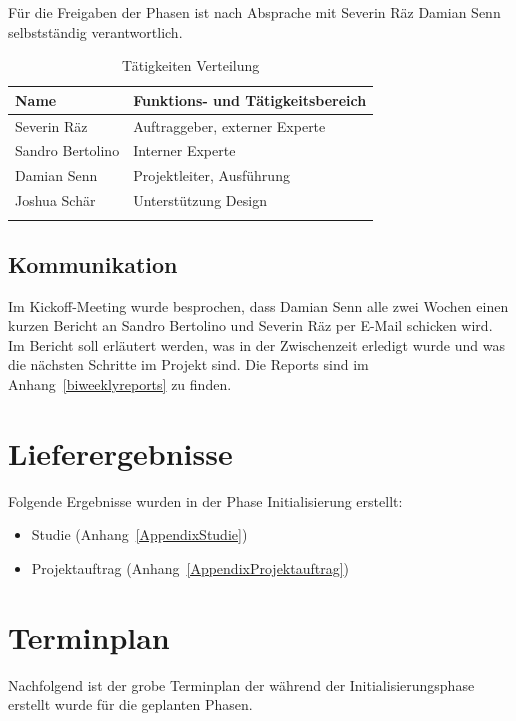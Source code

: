 Für die Freigaben der Phasen ist nach Absprache mit Severin Räz Damian Senn
selbstständig verantwortlich.

\begin{longtable}[]{@{}ll@{}}
  \toprule
  \textbf{Name}    & \textbf{Funktions- und Tätigkeitsbereich}\tabularnewline
  \midrule
  \endhead
  Severin Räz      & Auftraggeber, externer Experte\tabularnewline
  Sandro Bertolino & Interner Experte\tabularnewline
  Damian Senn      & Projektleiter, Ausführung\tabularnewline
  Joshua Schär     & Unterstützung Design\tabularnewline
  \bottomrule
  \caption{Tätigkeiten Verteilung}
\end{longtable}

\subsection{Kommunikation}\label{kommunikation}

Im Kickoff-Meeting wurde besprochen, dass Damian Senn alle zwei Wochen einen
kurzen Bericht an Sandro Bertolino und Severin Räz per E-Mail schicken wird.
Im Bericht soll erläutert werden, was in der Zwischenzeit erledigt wurde und
was die nächsten Schritte im Projekt sind. Die Reports sind im
Anhang~\ref{biweeklyreports} zu finden.



\section{Lieferergebnisse}

Folgende Ergebnisse wurden in der Phase Initialisierung erstellt:

\begin{itemize}
  \tightlist{}
  \item{}Studie (Anhang~\ref{AppendixStudie})
  \item{}Projektauftrag (Anhang~\ref{AppendixProjektauftrag})
\end{itemize}

\section{Terminplan}

Nachfolgend ist der grobe Terminplan der während der Initialisierungsphase
erstellt wurde für die geplanten Phasen.

